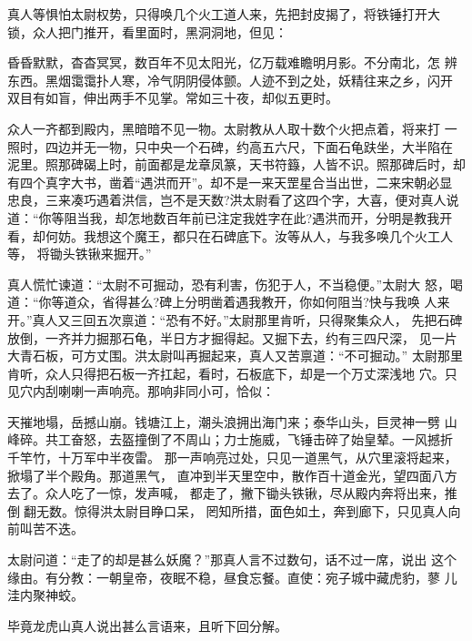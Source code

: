 真人等惧怕太尉权势，只得唤几个火工道人来，先把封皮揭了，将铁锤打开大
锁，众人把门推开，看里面时，黑洞洞地，但见：

昏昏默默，杳杳冥冥，数百年不见太阳光，亿万载难瞻明月影。不分南北，怎
辨东西。黑烟霭霭扑人寒，冷气阴阴侵体颤。人迹不到之处，妖精往来之乡，闪开
双目有如盲，伸出两手不见掌。常如三十夜，却似五更时。

众人一齐都到殿内，黑暗暗不见一物。太尉教从人取十数个火把点着，将来打
一照时，四边并无一物，只中央一个石碑，约高五六尺，下面石龟趺坐，大半陷在
泥里。照那碑碣上时，前面都是龙章凤篆，天书符籙，人皆不识。照那碑后时，却
有四个真字大书，凿着“遇洪而开”。却不是一来天罡星合当出世，二来宋朝必显
忠良，三来凑巧遇着洪信，岂不是天数?洪太尉看了这四个字，大喜，便对真人说
道：“你等阻当我，却怎地数百年前已注定我姓字在此?遇洪而开，分明是教我开
看，却何妨。我想这个魔王，都只在石碑底下。汝等从人，与我多唤几个火工人等，
将锄头铁锹来掘开。”

真人慌忙谏道：“太尉不可掘动，恐有利害，伤犯于人，不当稳便。”太尉大
怒，喝道：“你等道众，省得甚么?碑上分明凿着遇我教开，你如何阻当?快与我唤
人来开。”真人又三回五次禀道：“恐有不好。”太尉那里肯听，只得聚集众人，
先把石碑放倒，一齐并力掘那石龟，半日方才掘得起。又掘下去，约有三四尺深，
见一片大青石板，可方丈围。洪太尉叫再掘起来，真人又苦禀道：“不可掘动。”
太尉那里肯听，众人只得把石板一齐扛起，看时，石板底下，却是一个万丈深浅地
穴。只见穴内刮喇喇一声响亮。那响非同小可，恰似：

天摧地塌，岳撼山崩。钱塘江上，潮头浪拥出海门来；泰华山头，巨灵神一劈
山峰碎。共工奋怒，去盔撞倒了不周山；力士施威，飞锤击碎了始皇辇。一风撼折
千竿竹，十万军中半夜雷。
那一声响亮过处，只见一道黑气，从穴里滚将起来，掀塌了半个殿角。那道黑气，
直冲到半天里空中，散作百十道金光，望四面八方去了。众人吃了一惊，发声喊，
都走了，撇下锄头铁锹，尽从殿内奔将出来，推倒翻无数。惊得洪太尉目睁口呆，
罔知所措，面色如土，奔到廊下，只见真人向前叫苦不迭。

太尉问道：“走了的却是甚么妖魔？”那真人言不过数句，话不过一席，说出
这个缘由。有分教：一朝皇帝，夜眠不稳，昼食忘餐。直使：宛子城中藏虎豹，蓼
儿洼内聚神蛟。

毕竟龙虎山真人说出甚么言语来，且听下回分解。